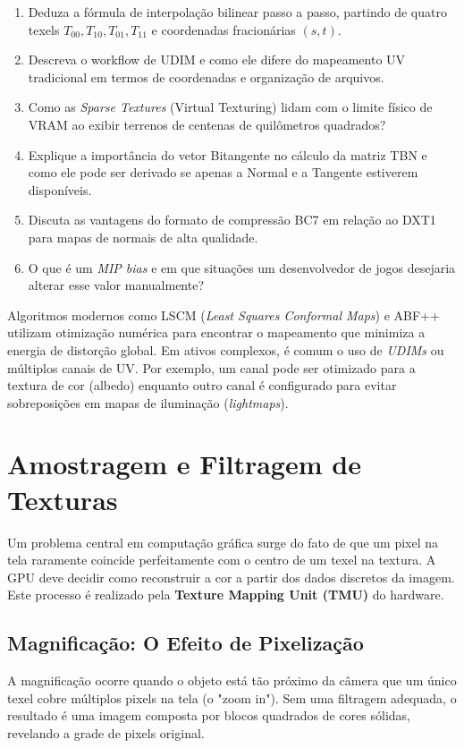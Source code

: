 \begin{enumerate}
    \item Deduza a fórmula de interpolação bilinear passo a passo, partindo de quatro texels $T_{00}, T_{10}, T_{01}, T_{11}$ e coordenadas fracionárias $(s, t)$.
    \item Descreva o workflow de UDIM e como ele difere do mapeamento UV tradicional em termos de coordenadas e organização de arquivos.
    \item Como as \textit{Sparse Textures} (Virtual Texturing) lidam com o limite físico de VRAM ao exibir terrenos de centenas de quilômetros quadrados?
    \item Explique a importância do vetor Bitangente no cálculo da matriz TBN e como ele pode ser derivado se apenas a Normal e a Tangente estiverem disponíveis.
    \item Discuta as vantagens do formato de compressão BC7 em relação ao DXT1 para mapas de normais de alta qualidade.
    \item O que é um \textit{MIP bias} e em que situações um desenvolvedor de jogos desejaria alterar esse valor manualmente?
\end{enumerate}


Algoritmos modernos como LSCM (\textit{Least Squares Conformal Maps}) e ABF++ utilizam otimização numérica para encontrar o mapeamento que minimiza a energia de distorção global. 
Em ativos complexos, é comum o uso de \textit{UDIMs} ou múltiplos canais de UV. 
Por exemplo, um canal pode ser otimizado para a textura de cor (albedo) enquanto outro canal é configurado para evitar sobreposições em mapas de iluminação (\textit{lightmaps}).

\section{Amostragem e Filtragem de Texturas}

Um problema central em computação gráfica surge do fato de que um pixel na tela raramente coincide perfeitamente com o centro de um texel na textura. 
A GPU deve decidir como reconstruir a cor a partir dos dados discretos da imagem. 
Este processo é realizado pela \textbf{Texture Mapping Unit (TMU)} do hardware.

\subsection{Magnificação: O Efeito de Pixelização}

A magnificação ocorre quando o objeto está tão próximo da câmera que um único texel cobre múltiplos pixels na tela (o "zoom in"). 
Sem uma filtragem adequada, o resultado é uma imagem composta por blocos quadrados de cores sólidas, revelando a grade de pixels original.

